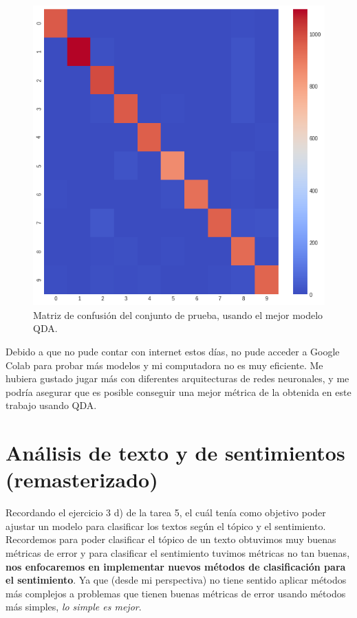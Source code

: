 \documentclass[paper=letter, fontsize=11pt]{scrartcl}
\numberwithin{equation}{section} %
\numberwithin{figure}{section} %
\numberwithin{table}{section} %
\begin{document}
\begin{figure}[H]
\centering
\includegraphics[scale=0.4]{figure/metric.png}
\caption{Matriz de confusión del conjunto de prueba, usando el mejor modelo QDA.}\label{ocho}
\end{figure}

Debido a que no pude contar con internet estos días, no pude acceder a Google Colab para probar más modelos y mi computadora no es muy eficiente. Me hubiera gustado jugar más con diferentes arquitecturas de redes neuronales, y me podría asegurar que es posible conseguir una mejor métrica de la obtenida en este trabajo usando QDA.

\section{Análisis de texto y de sentimientos (remasterizado)}
Recordando el ejercicio 3 d) de la tarea 5, el cuál tenía como objetivo poder ajustar un modelo para clasificar los textos según el tópico y el sentimiento. Recordemos para poder clasificar el tópico de un texto obtuvimos muy buenas métricas de error y para clasificar el sentimiento tuvimos métricas no tan buenas, \textbf{nos enfocaremos en implementar nuevos métodos de clasificación para el sentimiento}. Ya que (desde mi perspectiva) no tiene sentido aplicar métodos más complejos a problemas que tienen buenas métricas de error usando métodos más simples, \textit{lo simple es mejor}. \\
\end{document}
